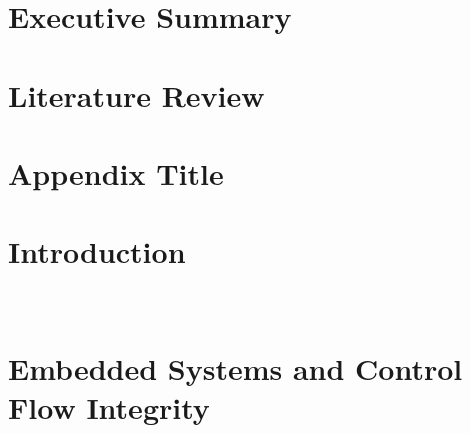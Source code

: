 \documentclass[
11pt, %
twoside, %
english, %
onehalfspacing, %
nolistspacing, %
liststotoc, %
parskip, %
headsepline, %
]{MastersDoctoralThesis} %
\author{Luke \textsc{Atherton}}
\newif\iflitreview
\newif\ifnotesincluded
\begin{document}
\frontmatter
\pagestyle{plain}



\iflitreview

\else

\fi
\ifnotesincluded

\chapter*{Acknowledgements}
Thanks everyone! Elisabeth

\fi

\tableofcontents
\lstlistoflistings
\listoffigures
\listoftables



\chapter*{Executive Summary}


\iflitreview

\chapter{Literature Review}


\appendix
\chapter{Appendix Title}

\else

\mainmatter
\pagestyle{thesis}

\chapter{Introduction}





\\


\chapter{Embedded Systems and Control Flow Integrity} \label{chapterCFI}





\end{document}
